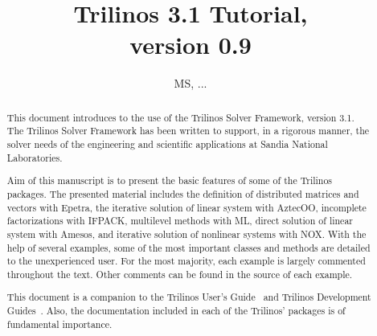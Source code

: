 \documentclass[10pt]{report}
\author{MS, ...}
\newcommand{\Trilinos}{Trilinos}
\begin{document}
\title{Trilinos 3.1 Tutorial, \\ version 0.9}
\maketitle



\begin{abstract}
  
  This document introduces to the use of the \Trilinos{} Solver
  Framework, version 3.1.  The \Trilinos{} Solver Framework has been
  written to support, in a rigorous manner, the solver needs of the
  engineering and scientific applications at Sandia National
  Laboratories.

  \medskip
  
  Aim of this manuscript is to present the basic features of some of the
  Trilinos packages. The presented material includes the definition of
  distributed matrices and vectors with Epetra, the iterative solution
  of linear system with AztecOO, incomplete factorizations with IFPACK,
  multilevel methods with ML, direct solution of linear system with
  Amesos, and iterative solution of nonlinear systems with NOX. With the
  help of several examples, some of the most important classes and
  methods are detailed to the unexperienced user.  For the most
  majority, each example is largely commented throughout the text. Other
  comments can be found in the source of each example.

  \medskip
  
  This document is a companion to the Trilinos User's
  Guide~\cite{Trilinos-Users-Guide} and Trilinos Development
  Guides~\cite{Trilinos-Dev-Guide,Trilinos-Dev-Guide-II}. Also, the
  documentation included in each of the Trilinos' packages is of
  fundamental importance.
 
\end{abstract}

\newpage
\clearpage

\tableofcontents

\clearpage
\end{document}
